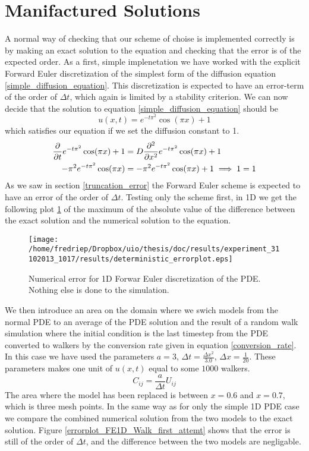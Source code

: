 \section{Manifactured Solutions}
A normal way of checking that our scheme of choise is implemented correctly is by making an exact solution to the equation and checking that the error is of the expected order. 
As a first, simple implenetation we have worked with the explicit Forward Euler discretization of the simplest form of the diffusion equation \ref{simple_diffusion_equation}. 
This discretization is expected to have an error-term of the order of $\Delta t$, which again is limited by a stability criterion. 
We can now decide that the solution to equation \ref{simple_diffusion_equation} should be
\begin{equation}\label{manifactured_solution_1D}
 u(x,t) = e^{-t\pi^2}\cos(\pi x) +1
\end{equation}
which satisfies our equation if we set the diffusion constant to 1.
\begin{align}
 \frac{\partial }{\partial t}e^{-t\pi^2}\cos(\pi x) +1 &= D\frac{\partial^2}{\partial x^2}e^{-t\pi^2}\cos(\pi x) +1\\
 -\pi^2e^{-t\pi^2}\cos(\pi x) &= -\pi^2e^{-t\pi^2}\cos(\pi x) +1 \implies 1 = 1
\end{align}
As we saw in section \ref{truncation_error} the Forward Euler scheme is expected to have an error of the order of $\Delta t$. 
Testing only the scheme first, in 1D we get the following plot \ref{errorplot_FE1D_noWalk} of the maximum of the absolute value of the difference between the exact solution and the numerical solution to the equation. 

\begin{figure}[H]

\centering
\texttt{[image: /home/fredriep/Dropbox/uio/thesis/doc/results/experiment\_31102013\_1017/results/deterministic\_errorplot.eps]}
\caption[Numerical error for 1D Forwar Euler discretization]{Numerical error for 1D Forwar Euler discretization of the PDE. Nothing else is done to the simulation.}
\label{errorplot_FE1D_noWalk}
\end{figure}

We then introduce an area on the domain where we swich models from the normal PDE to an average of the PDE solution and the result of a random walk simulation where the initial condition is the last timestep from the PDE converted to walkers by the conversion rate given in equation \ref{conversion_rate}. In this case we have used the parameters $a=3$, $\Delta t = \frac{\Delta x^2}{3.0}$, $\Delta x = \frac{1}{20}$. 
These parameters makes one unit of $u(x,t)$ equal to some $1000$ walkers. 
\begin{equation}\label{conversion_rate}
 C_{ij} = \frac{a}{\Delta t}U_{ij}
\end{equation}
The area where the model has been replaced is between $x=0.6$ and $x=0.7$, which is three mesh points. 
In the same way as for only the simple 1D PDE case we compare the combined numerical solution from the two models to the exact solution. 
Figure \ref{errorplot_FE1D_Walk_first_attemt} shows that the error is still of the order of $\Delta t$, and the difference between the two models are negligable. 

